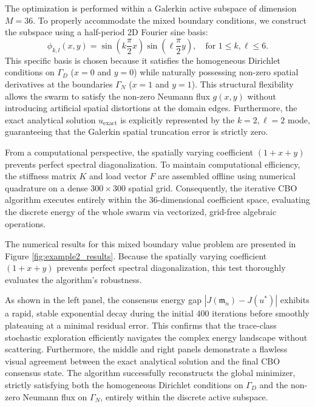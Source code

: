 \documentclass[12pt]{amsart}
\numberwithin{equation}{section}
\begin{document}
The optimization is performed within a Galerkin active subspace of dimension $M = 36$. To properly accommodate the mixed boundary conditions, we construct the subspace using a half-period 2D Fourier sine basis:
$$ \phi_{k,l}(x,y) = \sin\left(k\frac{\pi}{2}x\right) \sin\left(\ell\frac{\pi}{2}y\right), \quad \text{for } 1 \le k,\ell \le 6. $$
This specific basis is chosen because it satisfies the homogeneous Dirichlet conditions on $\Gamma_D$ ($x=0$ and $y=0$) while naturally possessing non-zero spatial derivatives at the boundaries $\Gamma_N$ ($x=1$ and $y=1$). This structural flexibility allows the swarm to satisfy the non-zero Neumann flux $g(x,y)$ without introducing artificial spatial distortions at the domain edges. Furthermore, the exact analytical solution $u_{\text{exact}}$ is explicitly represented by the $k=2, \ell=2$ mode, guaranteeing that the Galerkin spatial truncation error is strictly zero.

From a computational perspective, the spatially varying coefficient $(1+x+y)$ prevents perfect spectral diagonalization. To maintain computational efficiency, the stiffness matrix $K$ and load vector $F$ are assembled offline using numerical quadrature on a dense $300 \times 300$ spatial grid. Consequently, the iterative CBO algorithm executes entirely within the $36$-dimensional coefficient space, evaluating the discrete energy of the whole swarm via vectorized, grid-free algebraic operations.

The numerical results for this mixed boundary value problem are presented in Figure \ref{fig:example2_results}. Because the spatially varying coefficient $(1+x+y)$ prevents perfect spectral diagonalization, this test thoroughly evaluates the algorithm's robustness. 

As shown in the left panel, the consensus energy gap $|J(\mathfrak{m}_n) - J(u^*)|$ exhibits a rapid, stable exponential decay during the initial 400 iterations before smoothly plateauing at a minimal residual error. This confirms that the trace-class stochastic exploration efficiently navigates the complex energy landscape without scattering. Furthermore, the middle and right panels demonstrate a flawless visual agreement between the exact analytical solution and the final CBO consensus state. The algorithm successfully reconstructs the global minimizer, strictly satisfying both the homogeneous Dirichlet conditions on $\Gamma_D$ and the non-zero Neumann flux on $\Gamma_N$, entirely within the discrete active subspace.
\end{document}
